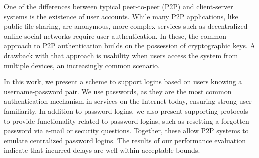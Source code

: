 
One of the differences between typical peer-to-peer (P2P) and client-server
systems is the existence of user accounts. While many P2P applications, like
public file sharing, are anonymous, more complex services such as
decentralized online social networks require user authentication. In these,
the common approach to P2P authentication builds on the possession of
cryptographic keys. A drawback with that approach is usability when users
access the system from multiple devices, an increasingly common scenario.

In this work, we present a scheme to support logins based on users knowing a
username-password pair. We use passwords, as they are the most common
authentication mechanism in services on the Internet today, ensuring strong
user familiarity. In addition to password logins, we also present supporting
protocols to provide functionality related to password logins, such as
resetting a forgotten password via e-mail or security questions. Together,
these allow P2P systems to emulate centralized password logins. The
results of our performance evaluation  indicate that incurred delays
are well within acceptable bounds.
